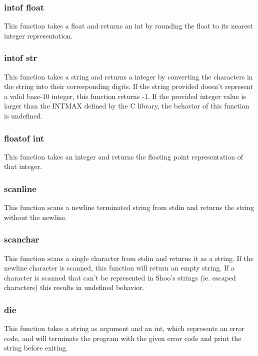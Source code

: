 \documentclass[12pt]{article}
\begin{document}
\subsubsection{int\textunderscore of \textunderscore float}
This function takes a float and returns an int by rounding the float to its nearest integer representation.

\subsubsection{int\textunderscore of \textunderscore str}
This function takes a string and returns a integer by converting the characters in the string into their corresponding digits. If the string provided doesn't represent a valid base-10 integer, this function returns -1.
If the provided integer value is larger than the INT\textunderscore MAX defined by the C library, the behavior of this function is undefined. 

\subsubsection{float\textunderscore of \textunderscore int}
This function takes an integer and returns the floating point representation of that integer.

\subsubsection{scan\textunderscore line}
This function scans a newline terminated string from stdin and returns the string without the newline.

\subsubsection{scan\textunderscore char}
This function scans a single character from stdin and returns it as a string. If the newline character is scanned, this function will return an empty string. If a character is scanned that can't be represented in Shoo's strings (ie. escaped characters) this results in undefined behavior.

\subsubsection{die}
This function takes a string as argument and an int, which represents an error code, and will terminate the program with the given error code and print the string before exiting.
\end{document}
